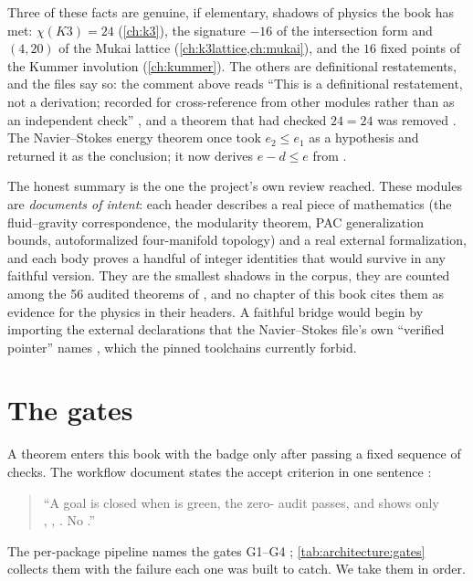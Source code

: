 Three of these facts are genuine, if elementary, shadows of physics the book has met:
$\chi(K3)=24$ (\cref{ch:k3}), the signature $-16$ of the intersection form and $(4,20)$ of
the Mukai lattice (\cref{ch:k3lattice,ch:mukai}), and the $16$ fixed points of the Kummer
involution (\cref{ch:kummer}). The others are definitional restatements, and the files say
so: the comment above  reads ``This is a definitional
restatement, not a derivation; recorded for cross-reference from other modules rather than
as an independent check'' , and a theorem
that had checked $24=24$ was removed . The
Navier--Stokes energy theorem once took $e_2\le e_1$ as a hypothesis and returned it as the
conclusion; it now derives $e-d\le e$ from 
.

The honest summary is the one the project's own review reached. These modules are
\emph{documents of intent}: each header describes a real piece of mathematics (the
fluid--gravity correspondence, the modularity theorem, PAC generalization bounds,
autoformalized four-manifold topology) and a real external formalization, and each body
proves a handful of integer identities that would survive in any faithful version. They are
the smallest shadows in the corpus, they are counted among the 56 audited theorems of
, and no chapter of this book cites them as evidence for the
physics in their headers. A faithful bridge would begin by importing the external
declarations that the Navier--Stokes file's own ``verified pointer'' names
, which the pinned toolchains currently forbid.

\section{The gates}\label{sec:architecture:gates}

A theorem enters this book with the badge \TA{} only after passing a fixed sequence of
checks. The workflow document states the accept criterion in one sentence
:
\begin{quote}
``A goal is closed when   is green, the
zero- audit passes, and  shows only\\
, , . No .''
\end{quote}
The per-package pipeline names the gates G1--G4 ; \cref{tab:architecture:gates} collects them with the failure each one was
built to catch. We take them in order.

